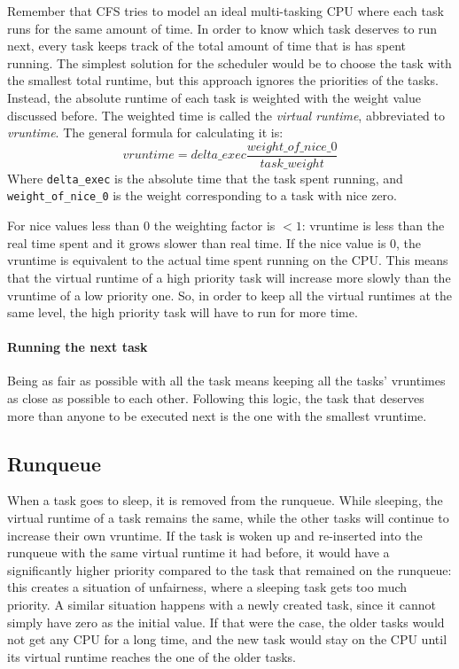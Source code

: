 Remember that CFS tries to model an ideal multi-tasking CPU where each task runs for the same amount of time. In order to know which task deserves to run next, every task keeps track of the total amount of time that is has spent running. The simplest solution for the scheduler would be to choose the task with the smallest total runtime, but this approach ignores the priorities of the tasks. Instead, the absolute runtime of each task is weighted with the weight value discussed before. The weighted time is called the \textit{virtual runtime}, abbreviated to \textit{vruntime}. The general formula for calculating it is:
\begin{equation} \label{eq:vruntime}
    vruntime = delta\_exec \frac{weight\_of\_nice\_0}{task\_weight}
\end{equation}
Where \verb|delta_exec| is the absolute time that the task spent running, and \verb|weight_of_nice_0| is the weight corresponding to a task with nice zero. 

For nice values less than 0 the weighting factor is $< 1$: vruntime is less than the real time spent and it grows slower than real time. If the nice value is 0, the vruntime is equivalent to the actual time spent running on the CPU. This means that the virtual runtime of a high priority task will increase more slowly than the vruntime of a low priority one. So, in order to keep all the virtual runtimes at the same level, the high priority task will have to run for more time.

\paragraph{Running the next task}

Being as fair as possible with all the task means keeping all the tasks' vruntimes as close as possible to each other. Following this logic, the task that deserves more than anyone to be executed next is the one with the smallest vruntime.

\subsection{Runqueue}
When a task goes to sleep, it is removed from the runqueue. While sleeping, the virtual runtime of a task remains the same, while the other tasks will continue to increase their own vruntime. If the task is woken up and re-inserted into the runqueue with the same virtual runtime it had before, it would have a significantly higher priority compared to the task that remained on the runqueue: this creates a situation of unfairness, where a sleeping task gets too much priority.
A similar situation happens with a newly created task, since it cannot simply have zero as the initial value. If that were the case, the older tasks would not get any CPU for a long time, and the new task would stay on the CPU until its virtual runtime reaches the one of the older tasks.

